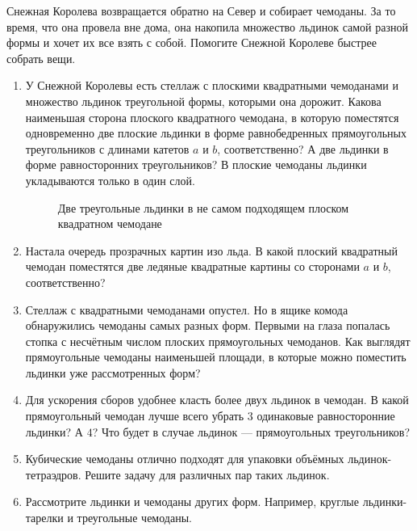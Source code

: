 \newcommand{\mb}[1]{\mathbb{#1}}
\newcommand{\conv}{\operatorname{conv}}

Снежная Королева возвращается обратно на Север и собирает чемоданы. За то время, что она провела вне дома, она накопила множество льдинок самой разной формы и хочет их все взять с собой. Помогите Снежной Королеве быстрее собрать вещи.

\begin{enumerate}
\item У Снежной Королевы есть стеллаж с плоскими квадратными чемоданами и множество льдинок треугольной формы, которыми она дорожит. Какова наименьшая сторона плоского квадратного чемодана, в которую поместятся одновременно две плоские льдинки в форме равнобедренных прямоугольных треугольников с длинами катетов $a$ и $b$, соответственно? А две льдинки в форме равносторонних треугольников? В плоские чемоданы льдинки укладываются только в один слой.
\begin{figure}[h]
\begin{center}
\end{center}
\caption{Две треугольные льдинки в не самом подходящем плоском квадратном чемодане}
\end{figure}
\item Настала очередь прозрачных картин изо льда. В какой плоский квадратный чемодан поместятся две ледяные квадратные картины со сторонами $a$ и $b$, соответственно?
\item Стеллаж с квадратными чемоданами опустел. Но в ящике комода обнаружились чемоданы самых разных форм. Первыми на глаза попалась стопка с несчётным числом плоских прямоугольных чемоданов. Как выглядят прямоугольные чемоданы наименьшей площади, в которые можно поместить льдинки уже рассмотренных форм?
\item Для ускорения сборов удобнее класть более двух льдинок в чемодан. В какой прямоугольный чемодан лучше всего убрать $3$ одинаковые равносторонние льдинки? А $4$? Что будет в случае льдинок --- прямоугольных треугольников?
\item Кубические чемоданы отлично подходят для упаковки объёмных льдинок-тетраэдров. Решите задачу для различных пар таких льдинок.
\item Рассмотрите льдинки и чемоданы других форм. Например, круглые льдинки-тарелки и треугольные чемоданы.
\end{enumerate}


